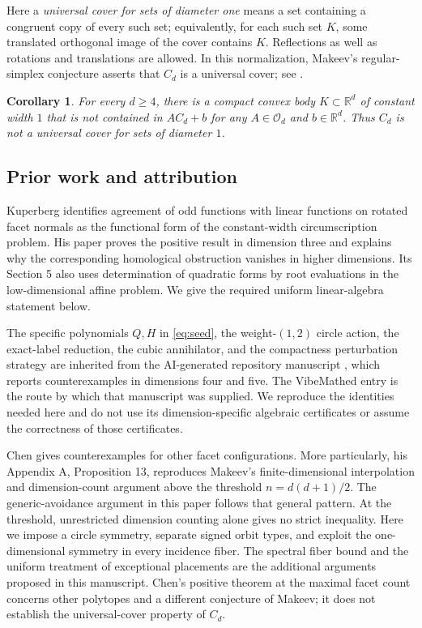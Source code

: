 \documentclass[11pt,reqno]{amsart}
\newtheorem{corollary}[corollary]{Corollary}
\theoremstyle{definition}
\theoremstyle{remark}
\numberwithin{equation}{section}
\newcommand{\R}{\mathbb R}
\newcommand{\Orth}{\mathcal O_d}
\begin{document}
Here a \emph{universal cover for sets of diameter one} means a set
containing a congruent copy of every such set; equivalently, for each
such set $K$, some translated orthogonal image of the cover contains $K$.
Reflections as well as rotations and translations are allowed. In this
normalization, Makeev's regular-simplex conjecture asserts that $C_d$ is
a universal cover; see \cite[Conjecture 1]{Kuperberg1999}.

\begin{corollary}\label{cor:cover}
For every $d\geq4$, there is a compact convex body $K\subset\R^d$
of constant width $1$ that is not contained in $A C_d+b$ for any
$A\in\Orth$ and $b\in\R^d$. Thus $C_d$ is not a universal cover for
sets of diameter $1$.
\end{corollary}

\subsection{Prior work and attribution}
Kuperberg \cite[Section 1, Proposition 1]{Kuperberg1999} identifies
agreement of odd functions with linear functions on rotated facet
normals as the functional form of the constant-width circumscription
problem. His paper proves the positive result in dimension three and
explains why the corresponding homological obstruction vanishes in
higher dimensions. Its Section 5 also uses determination of quadratic
forms by root evaluations in the low-dimensional affine problem.
We give the required uniform linear-algebra statement below.

The specific polynomials $Q,H$ in \eqref{eq:seed}, the weight-$(1,2)$
circle action, the exact-label reduction, the cubic annihilator, and the
compactness perturbation strategy are inherited from the AI-generated
repository manuscript \cite{ChatGPT2026}, which reports counterexamples
in dimensions four and five. The VibeMathed entry \cite{VibeMathed2026}
is the route by which that manuscript was supplied. We reproduce the
identities needed here and do not use its dimension-specific algebraic
certificates or assume the correctness of those certificates.

Chen \cite[Section 2]{Chen2026} gives counterexamples for other facet
configurations. More particularly, his Appendix A, Proposition 13,
reproduces Makeev's finite-dimensional interpolation and dimension-count
argument above the threshold $n=d(d+1)/2$. The generic-avoidance argument
in this paper follows that general pattern. At the threshold,
unrestricted dimension counting alone gives no strict inequality.
Here we impose a circle symmetry, separate signed orbit types, and
exploit the one-dimensional symmetry in every incidence fiber.
The spectral fiber bound and the uniform treatment of exceptional
placements are the additional arguments proposed in this manuscript.
Chen's positive theorem at the maximal facet count concerns other
polytopes and a different conjecture of Makeev; it does not establish
the universal-cover property of $C_d$.
\end{document}
